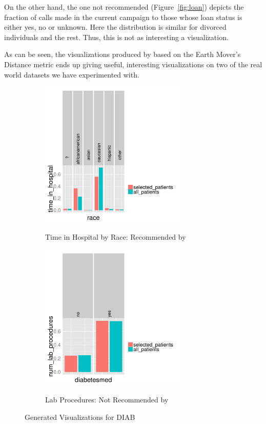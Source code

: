 On the other hand, the one not recommended (Figure~\ref{fig:loan})
depicts the fraction of calls made in the current campaign to those
whose loan status is either yes, no or unknown. 
Here the distribution is similar for divorced individuals and the rest.
Thus, this is not as interesting a visualization.

As can be seen, 
the visualizations produced by \VizRecDB based on the Earth Mover's Distance
metric ends up giving useful, interesting visualizations on two of
the real world datasets we have experimented with.



\begin{figure}[h] 
\centering
\begin{subfigure}{0.8\linewidth}
\centering
{\includegraphics[width=7cm] {Images/seedb_dim_race_measure_time_in_hospital.pdf}}
\caption{Time in Hospital by Race: Recommended by \VizRecDB}
\label{fig:time-in-hospital}
\end{subfigure}
\begin{subfigure}{0.8\linewidth}
\centering
{\includegraphics[width=7cm] {Images/seedb_dim_diabetesmed_measure_num_lab_procedures.pdf}}
\caption{Lab Procedures: Not Recommended by \VizRecDB}
\label{fig:lab-procedures}
\end{subfigure}
\vspace{-10pt}
\caption{\VizRecDB Generated Visualizations for DIAB}\label{fig:qual-study}
\vspace{-10pt}
\end{figure}


